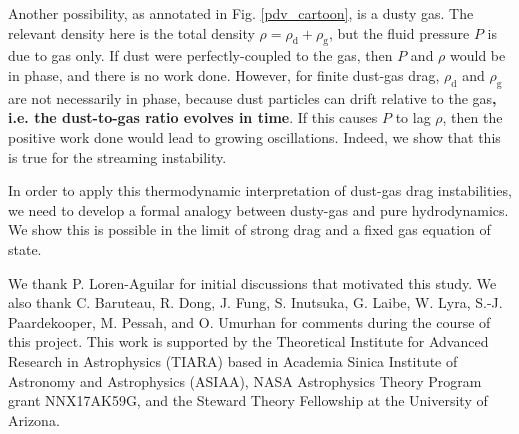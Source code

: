 \documentclass[iop, numberedappendix]{emulateapj}
\newcommand{\rhod}{\rho_\mathrm{d}}
\newcommand{\rhog}{\rho_\mathrm{g}}
\begin{document}

Another possibility, as annotated in Fig. \ref{pdv_cartoon}, is a dusty gas. The
relevant density here is the total density $\rho = \rhod + \rhog$, 
but the fluid pressure $P$ is due to gas only. If dust were 
perfectly-coupled to the gas, then $P$ and $\rho$ would be in phase, 
and there is no work done. However, for finite dust-gas drag, $\rhod$ and
$\rhog$ are not necessarily in phase, because dust particles can
drift relative to the gas{\bf, i.e. the dust-to-gas ratio evolves in time}. 
If this causes $P$ to lag 
$\rho$, then the positive work done would lead to growing
oscillations. Indeed, we show that this is true for the streaming
instability. 

In order to apply this thermodynamic interpretation of dust-gas drag
instabilities, we need to develop a formal analogy between dusty-gas
and pure hydrodynamics. We show this is possible in the limit of
strong drag and a fixed gas equation of state. 





\acknowledgements
We thank P. Loren-Aguilar for initial discussions that motivated this study. We also thank 
C. Baruteau, R. Dong, J. Fung, S. Inutsuka, G. Laibe, W. Lyra, S.-J. Paardekooper, 
M. Pessah, and O. Umurhan for comments during the course of this project. 
This work is supported by the Theoretical Institute for Advanced Research in Astrophysics   
(TIARA) based in Academia Sinica Institute of Astronomy and
Astrophysics (ASIAA), NASA Astrophysics Theory Program grant
NNX17AK59G, and  
the Steward Theory Fellowship at the University of Arizona.   



\appendix




\end{document}
